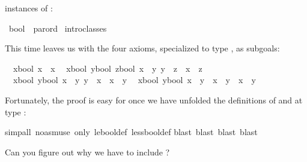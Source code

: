 \begin{isabellebody}
\begin{isamarkuptext}
instances of :%
\end{isamarkuptext}%
\isamarkuptrue%
\isamarkupfalse%
\ bool\ {\isacharcolon}{\isacharcolon}\ parord\isanewline
%
\isadelimproof
%
\endisadelimproof
%
\isatagproof
{}\isamarkupfalse%
\ intro{\isacharunderscore}classes%
\begin{isamarkuptxt}%
\noindent
This time  leaves us with the four axioms,
specialized to type , as subgoals:
\begin{isabelle}%
\ {}{\isachardot}\ {\isasymAnd}x{\isasymColon}bool{\isachardot}\ x\ {\isacharless}{\isacharless}{\isacharequal}\ x\isanewline
\ {}{\isachardot}\ {\isasymAnd}{\isacharparenleft}x{\isasymColon}bool{\isacharparenright}\ {\isacharparenleft}y{\isasymColon}bool{\isacharparenright}\ z{\isasymColon}bool{\isachardot}\ {\isasymlbrakk}x\ {\isacharless}{\isacharless}{\isacharequal}\ y{\isacharsemicolon}\ y\ {\isacharless}{\isacharless}{\isacharequal}\ z{\isasymrbrakk}\ {\isasymLongrightarrow}\ x\ {\isacharless}{\isacharless}{\isacharequal}\ z\isanewline
\ {}{\isachardot}\ {\isasymAnd}{\isacharparenleft}x{\isasymColon}bool{\isacharparenright}\ y{\isasymColon}bool{\isachardot}\ {\isasymlbrakk}x\ {\isacharless}{\isacharless}{\isacharequal}\ y{\isacharsemicolon}\ y\ {\isacharless}{\isacharless}{\isacharequal}\ x{\isasymrbrakk}\ {\isasymLongrightarrow}\ x\ {\isacharequal}\ y\isanewline
\ {}{\isachardot}\ {\isasymAnd}{\isacharparenleft}x{\isasymColon}bool{\isacharparenright}\ y{\isasymColon}bool{\isachardot}\ {\isacharparenleft}x\ {\isacharless}{\isacharless}\ y{\isacharparenright}\ {\isacharequal}\ {\isacharparenleft}x\ {\isacharless}{\isacharless}{\isacharequal}\ y\ {\isasymand}\ x\ {\isasymnoteq}\ y{\isacharparenright}%
\end{isabelle}
Fortunately, the proof is easy for 
once we have unfolded the definitions
of \isa{{\isacharless}{\isacharless}} and \isa{{\isacharless}{\isacharless}{\isacharequal}} at type :%
\end{isamarkuptxt}%
\isamarkuptrue%
\isamarkupfalse%
{\isacharparenleft}simp{\isacharunderscore}all\ {\isacharparenleft}no{\isacharunderscore}asm{\isacharunderscore}use{\isacharparenright}\ only{\isacharcolon}\ le{\isacharunderscore}bool{\isacharunderscore}def\ less{\isacharunderscore}bool{\isacharunderscore}def{\isacharparenright}\isanewline
{}\isamarkupfalse%
{\isacharparenleft}blast{\isacharcomma}\ blast{\isacharcomma}\ blast{\isacharcomma}\ blast{\isacharparenright}%
\endisatagproof
{\isafoldproof}%
%
\isadelimproof
%
\endisadelimproof
%
\begin{isamarkuptext}%
\noindent
Can you figure out why we have to include ?


\end{isamarkuptext}
\end{isabellebody}
